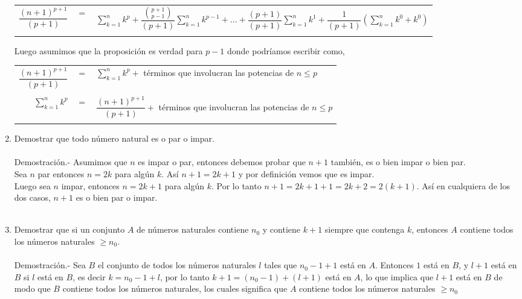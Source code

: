 \begin{enumerate}
\begin{center}
\begin{tabular}{rcl}
	    $\dfrac{(n+1)^{p+1}}{(p+1)}$&$=$&$\sum\limits_{k=1}^n k^p + \dfrac{{p+1 \choose p-1}}{(p+1)} \sum\limits_{k=1}^n k^{p-1} + ... + \dfrac{(p+1)}{(p+1)} \sum\limits_{k=1}^n k^1 + \dfrac{1}{(p+1)} \left( \sum\limits_{k=1}^n k^0+ k^0 \right)$\\\\
	 \end{tabular}
      \end{center}
      Luego asumimos que la proposición es verdad para $p-1$ donde podríamos escribir como,
      \begin{center}
	 \begin{tabular}{rcl}
	    $\dfrac{(n+1)^{p+1}}{(p+1)}$&$=$&$\sum\limits_{k=1}^{n} k^p +$ términos que involucran las potencias de $n \leq p$\\\\
	    $\sum\limits_{k=1}^n k^p$&$=$&$\dfrac{(n+1)^{p+1}}{(p+1)} + $ términos que involucran las potencias de $n \leq p$\\\\
	 \end{tabular}
      \end{center}

      \item Demostrar que todo número natural es o par o impar.\\\\
      Demostración.- \; Asumimos que $n$ es impar o par, entonces debemos probar que $n+1$ también, es o bien impar o bien par.\\ 
      Sea $n$ par entonces $n=2k$ para algún $k$. Así $n+1=2k+1$  y por definición vemos que es impar.\\
      Luego sea $n$ impar, entonces $n=2k+1$ para algún $k$.  Por lo tanto $n+1=2k+1+1 = 2k +2 = 2(k+1)$. Así en cualquiera de los dos casos, $n+1$ es o bien par o impar. \\\\   

      \item Demostrar que si un conjunto $A$ de números naturales contiene $n_0$ y contiene $k+1$ siempre que contenga $k$, entonces $A$ contiene todos los números naturales $\geq n_0$.\\\\
	 Demostración.- \; Sea $B$ el conjunto de todos los números naturales $l$ tales que $n_0 -1 +1$ está en $A$. Entonces $1$ está en $B$, y $l+1$ está en  $B$ si $l$ está en $B$, es decir $k=n_0 -1 + l $, por lo tanto $k+1=(n_0 -1 )+(l+1)$ está en $A$, lo que implica que $l+1$ está en $B$ de modo que $B$ contiene todos los números naturales, los cuales significa que $A$  contiene todos los números naturales $\geq n_0$\\\\


\end{enumerate}
